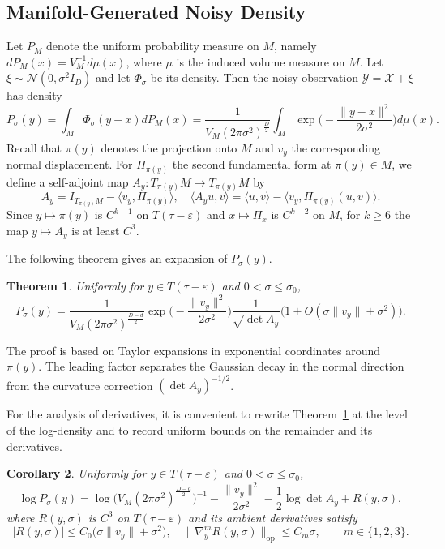 \documentclass[11pt]{article}
\theoremstyle{plain}
\newtheorem{theorem}{Theorem}[section]
\newtheorem{corollary}[theorem]{Corollary}
\theoremstyle{definition}
\begin{document}
\subsection{Manifold-Generated Noisy Density}
Let $P_M$ denote the uniform probability measure on $M$, namely $dP_M(x)=V_M^{-1}d\mu(x)$, where $\mu$ is the induced volume measure on $M$. Let $\xi\sim\mathcal N(0,\sigma^2I_D)$ and let $\Phi_\sigma$ be its density. Then the noisy observation $\mathcal Y= \mathcal X+\xi$ has density
\[
P_{\sigma}(y)= \int_M \Phi_\sigma(y-x)dP_M(x) = \frac{1}{V_M(2\pi\sigma^2)^{\frac{D}{2}}} \int_M \exp\big(-\frac{\|y-x\|^2}{2\sigma^2}\big)d\mu(x). 
\]
Recall that $\pi(y)$ denotes the projection onto $M$ and $v_y$ the corresponding normal displacement. For $\Pi_{\pi(y)}$ the second fundamental form at $\pi(y)\in M$, we define a self-adjoint map $A_y \colon T_{\pi(y)}M \to T_{\pi(y)}M$ by
\[
A_y = I_{T_{\pi(y)}M} - \langle v_y, \Pi_{\pi(y)}\rangle,
\quad
\langle A_y u, v\rangle
=
\langle u,v\rangle - \langle v_y,\Pi_{\pi(y)}(u,v)\rangle.
\]
Since $y \mapsto \pi(y)$ is $C^{k-1}$ on $T(\tau-\varepsilon)$ and $x\mapsto \Pi_x$ is $C^{k-2}$ on $M$, for $k\ge 6$ the map $y\mapsto A_y$ is at least $C^3$.

The following theorem gives an expansion of $P_\sigma(y)$.
\begin{theorem}\label{th:probability-noisy}
Uniformly for $y\in T(\tau-\varepsilon)$ and $0<\sigma\le\sigma_0$,
\[
P_\sigma(y)
=\frac{1}{V_M(2\pi\sigma^2)^{\frac{D-d}{2}}}
\exp\big(-\frac{\|v_y\|^2}{2\sigma^2}\big)
\frac{1}{\sqrt{\det A_y}}
\big(1+O(\sigma\|v_y\| + \sigma^2)\big).
\] 
\end{theorem}
The proof is based on Taylor expansions in exponential coordinates around $\pi(y)$. The leading factor separates the Gaussian decay in the normal direction from the curvature correction $(\det A_y)^{-1/2}$.

For the analysis of derivatives, it is convenient to rewrite Theorem~\ref{th:probability-noisy} at the level of the log-density and to record uniform bounds on the remainder and its derivatives.

\begin{corollary}\label{co:log-density}
Uniformly for $y\in T(\tau-\varepsilon)$ and $0<\sigma\le\sigma_0$,
\begin{equation}\label{eq:log density}
\log P_\sigma(y)
=
\log \big(V_M(2\pi\sigma^2)^{\frac{D-d}{2}}\big)^{-1}
-
\frac{\|v_y\|^2}{2\sigma^2}
-
\frac{1}{2}\log\det A_y
+
R(y,\sigma),
\end{equation}
where $R(y,\sigma)$ is $C^3$ on $T(\tau-\varepsilon)$ and its ambient derivatives satisfy
\[
|R(y,\sigma)| \le C_{0}\big(\sigma\|v_y\|+\sigma^2\big),
\quad
\|\nabla_y^m R(y,\sigma)\|_{\mathrm{op}}
\le
C_{m}\sigma,
\qquad
m\in\{1,2,3\}.
\]
\end{corollary}
\end{document}
